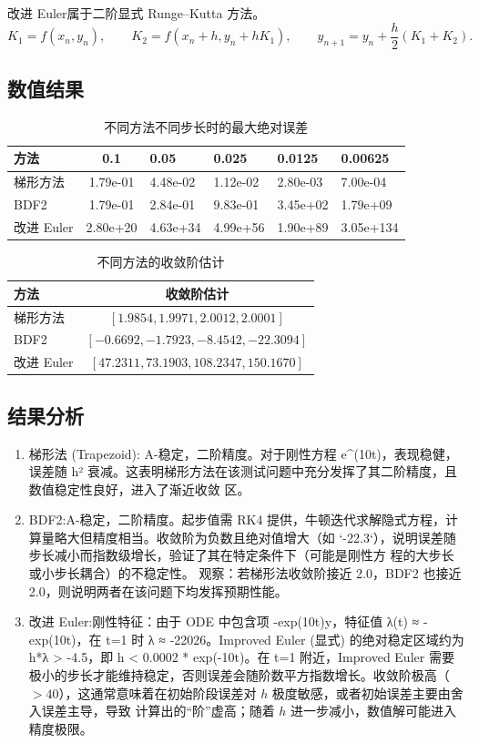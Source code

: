 \documentclass[UTF8,a4paper,11pt]{ctexart}                    %
\begin{document}
改进 Euler属于二阶显式 Runge--Kutta 方法。
\[
  K_1=f(x_n,y_n),\qquad K_2=f(x_n+h,y_n+hK_1),\qquad
  y_{n+1}=y_n+\frac{h}{2}(K_1+K_2).
\]



\subsection{数值结果}

\begin{table}[H]
  \centering
  \caption{不同方法不同步长时的最大绝对误差}
  \begin{tabular}{lc}
    \toprule
    方法 & 0.1 & 0.05 & 0.025 & 0.0125 & 0.00625\\
    \midrule
    梯形方法 & 1.79e-01 &4.48e-02 &1.12e-02& 2.80e-03& 7.00e-04\\
    BDF2 & 1.79e-01 & 2.84e-01 & 9.83e-01 & 3.45e+02 &  1.79e+09\\
    改进 Euler &  2.80e+20 & 4.63e+34 & 4.99e+56 & 1.90e+89 & 3.05e+134\\
    \bottomrule
  \end{tabular}
\end{table}

\begin{table}[H]
  \centering
  \caption{不同方法的收敛阶估计}
  \begin{tabular}{lc}
    \toprule
    方法 & 收敛阶估计\\
    \midrule
    梯形方法 & $[ 1.9854, 1.9971, 2.0012, 2.0001 ]$ \\
    BDF2 & $[ -0.6692, -1.7923, -8.4542, -22.3094 ]$ \\
    改进 Euler & $[ 47.2311, 73.1903, 108.2347, 150.1670 ]$ \\
    \bottomrule
  \end{tabular}
\end{table}


\subsection{结果分析}

\begin{enumerate}
  \item 梯形法 (Trapezoid): A-稳定，二阶精度。对于刚性方程 e^(10t)，表现稳健，误差随 h² 衰减。这表明梯形方法在该测试问题中充分发挥了其二阶精度，且数值稳定性良好，进入了渐近收敛
区。
  \item BDF2:A-稳定，二阶精度。起步值需 RK4 提供，牛顿迭代求解隐式方程，计算量略大但精度相当。收敛阶为负数且绝对值增大（如 `-22.3`），说明误差随步长减小而指数级增长，验证了其在特定条件下（可能是刚性方
程的大步长或小步长耦合）的不稳定性。
观察：若梯形法收敛阶接近 2.0，BDF2 也接近 2.0，则说明两者在该问题下均发挥预期性能。
  \item 改进 Euler:刚性特征：由于 ODE 中包含项 -exp(10t)y，特征值 λ(t) ≈ -exp(10t)，在 t=1 时 λ ≈ -22026。Improved Euler (显式) 的绝对稳定区域约为 h*λ > -4.5，即 h < 0.0002 * exp(-10t)。在 t=1 附近，Improved Euler 需要极小的步长才能维持稳定，否则误差会随阶数平方指数增长。收敛阶极高（$>40$），这通常意味着在初始阶段误差对 $h$ 极度敏感，或者初始误差主要由舍入误差主导，导致
计算出的“阶”虚高；随着 $h$ 进一步减小，数值解可能进入精度极限。
\end{enumerate}
\end{document}
